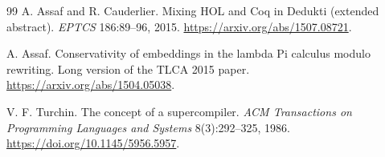 \documentclass[11pt]{article}
\theoremstyle{definition}
\theoremstyle{remark}
\begin{document}
\begin{thebibliography}{99}
A. Assaf and R. Cauderlier.
\newblock Mixing HOL and Coq in Dedukti (extended abstract).
\newblock \emph{EPTCS} 186:89--96, 2015.
\newblock \url{https://arxiv.org/abs/1507.08721}.

A. Assaf.
\newblock Conservativity of embeddings in the lambda Pi calculus modulo rewriting.
\newblock Long version of the TLCA 2015 paper.
\newblock \url{https://arxiv.org/abs/1504.05038}.

V. F. Turchin.
\newblock The concept of a supercompiler.
\newblock \emph{ACM Transactions on Programming Languages and Systems}
  8(3):292--325, 1986.
\newblock \url{https://doi.org/10.1145/5956.5957}.

\end{thebibliography}
\end{document}
